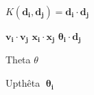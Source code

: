 \documentclass{article}
\begin{document}
$K(\boldsymbol{d_i}, \boldsymbol{d_j}) = \boldsymbol{d_i} \cdot \boldsymbol{d_j}$

$\boldsymbol{v_i} \cdot \boldsymbol{v_j}$
$\boldsymbol{x_i} \cdot \boldsymbol{x_j}$
$\boldsymbol{\theta_i} \cdot \boldsymbol{d_j}$

Theta $\theta$

Upthêta $\boldsymbol{\uptheta_i}$ %
\end{document}
